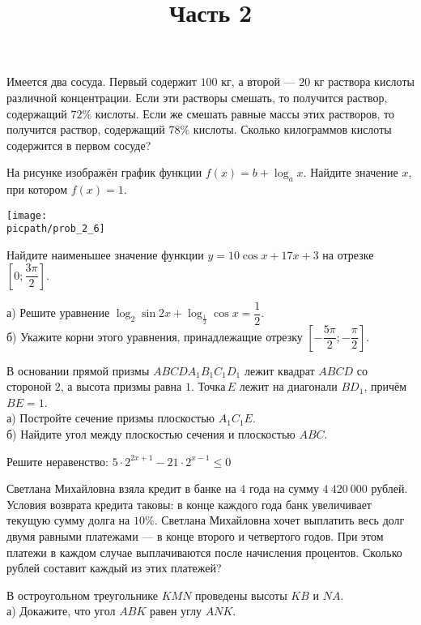 \begin{training}[2]
\begin{listofex}
		\foranswer
		\item Имеется два сосуда. Первый содержит \( 100 \) кг, а второй --- \( 20 \) кг раствора кислоты различной концентрации. Если эти растворы смешать, то получится раствор, содержащий \( 72\% \) кислоты. Если же смешать равные массы этих растворов, то получится раствор, содержащий \( 78\% \) кислоты. Сколько килограммов кислоты содержится в первом сосуде?
		\foranswer
		\newpage
		\hphantom{Часть 1}
		\item 
		На рисунке изображён график функции \( f(x)=b+\log_ax \). Найдите значение \( x \), при котором \( f(x)=1 \).
		\begin{center}
			\texttt{[image: \\picpath/prob\_2\_6]}
		\end{center}
		\foranswer
		\item Найдите наименьшее значение функции \( y=10\cos x+17x+3 \) на отрезке \( \left[ 0;\dfrac{3\pi}{2}\right]  \).
		\foranswer
		\egepreambtwo
		\title{Часть 2}
		\item а) Решите уравнение \( \log_2\sin2x+\log_{\tfrac{1}{2}}\cos x=\dfrac{1}{2} \). \\
		б) Укажите корни этого уравнения, принадлежащие отрезку \( \left[ -\dfrac{5\pi}{2};-\dfrac{\pi}{2} \right]  \).
		\newpage
		\hphantom{Часть 1}
		\item В основании прямой призмы \( ABCDA_1B_1C_1D_1 \) лежит квадрат \( ABCD \) со стороной \( 2 \), а высота призмы равна \( 1 \). Точка \( E \) лежит на диагонали \( BD_1 \), причём \( BE=1 \).\\
		а)  Постройте сечение призмы плоскостью \( A_1C_1E \).\\		
		б)  Найдите угол между плоскостью сечения и плоскостью \( ABC \).
		\item Решите неравенство: \( 5\cdot2^{2x+1}-21\cdot2^{x-1}\le0 \)
		\item Светлана Михайловна взяла кредит в банке на \( 4 \) года на сумму \( 4\: 420\: 000 \) рублей. Условия возврата кредита таковы: в конце каждого года банк увеличивает текущую сумму долга на \( 10\% \). Светлана Михайловна хочет выплатить весь долг двумя равными платежами --- в конце второго и четвертого годов. При этом платежи в каждом случае выплачиваются после начисления процентов. Сколько рублей составит каждый из этих платежей?
		\item В остроугольном треугольнике \( KMN \) проведены высоты \( KB \) и \( NA \).\\
		а)  Докажите, что угол \( ABK \) равен углу \( ANK \).	\\

\end{listofex}
\end{training}
